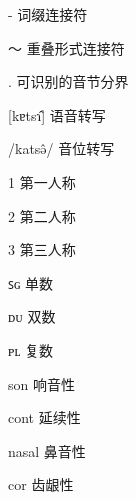 \documentclass[
    decl-page,  %
    twoside,                %
    cjk-font = win,
    latin-font = none,
  ]{njuthesis}
\begin{document}
\tableofcontents
\listoffigures
\listoftables

\mainmatter

\begin{notation}[10cm]
   \item[-] 词缀连接符
   \item[～] 重叠形式连接符
   \item[.] 可识别的音节分界
   \item[{[}kɐtsɿ̂{]}] 语音转写
   \item[/katsə̂/] 音位转写
   \item[1] 第一人称
   \item[2] 第二人称
   \item[3] 第三人称
   \item[ꜱɢ] 单数
   \item[ᴅᴜ] 双数
   \item[ᴘʟ] 复数
   \item[son] 响音性
   \item[cont] 延续性
   \item[nasal] 鼻音性
   \item[cor] 齿龈性
\end{notation}








\printbibliography


\appendix



\end{document}
